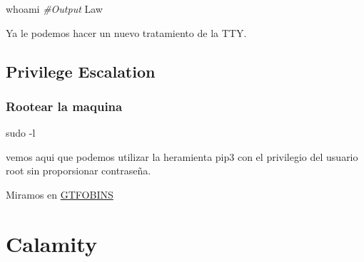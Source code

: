 \documentclass{assets/ipesethesis}
\newenvironment{Shaded}{\begin{snugshade}}{\end{snugshade}}
\newcommand{\BuiltInTok}[1]{#1}
\newcommand{\CommentTok}[1]{\textcolor[rgb]{0.56,0.35,0.01}{\textit{#1}}}
\newcommand{\ExtensionTok}[1]{#1}
\newcommand{\FunctionTok}[1]{\textcolor[rgb]{0.00,0.00,0.00}{#1}}
\newcommand{\NormalTok}[1]{#1}
\newcommand{\OperatorTok}[1]{\textcolor[rgb]{0.81,0.36,0.00}{\textbf{#1}}}
\newcommand{\StringTok}[1]{\textcolor[rgb]{0.31,0.60,0.02}{#1}}
\newcommand{\VariableTok}[1]{\textcolor[rgb]{0.00,0.00,0.00}{#1}}
\begin{document}
\begin{Shaded}
\begin{Highlighting}[]
\FunctionTok{whoami}
\CommentTok{#Output}
\ExtensionTok{Law}
\end{Highlighting}
\end{Shaded}

Ya le podemos hacer un nuevo tratamiento de la TTY.

\hypertarget{privilege-escalation-4}{%
\section*{Privilege Escalation}\label{privilege-escalation-4}}

\hypertarget{rootear-la-maquina}{%
\subsection*{Rootear la maquina}\label{rootear-la-maquina}}

\begin{Shaded}
\begin{Highlighting}[]
\FunctionTok{sudo}\NormalTok{ -l}
\end{Highlighting}
\end{Shaded}

vemos aqui que podemos utilizar la heramienta pip3 con el privilegio del usuario root sin proporsionar contraseña.

Miramos en \href{https://gtfobins.github.io/gtfobins/pip/\#sudo}{GTFOBINS}

\begin{Shaded}
\end{Shaded}

\hypertarget{calamity}{%
\chapter*{Calamity}\label{calamity}}
\end{document}
